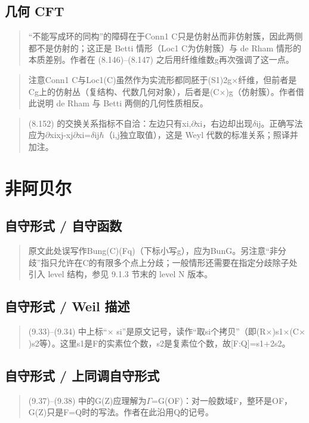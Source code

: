 \subsection*{几何 CFT}
\begin{quote}\small
“不能写成环的同构”的障碍在于Conn1 C只是仿射丛而非仿射簇，因此两侧都不是仿射的；这正是 Betti 情形（Loc1 C为仿射簇）与 de Rham 情形的本质差别。作者在 (8.146)–(8.147) 之后用纤维维数g再次强调了这一点。
\end{quote}

\begin{quote}\small
注意Conn1 C与Loc1(C)虽然作为实流形都同胚于(S1)2g$\times$纤维，但前者是Cg上的仿射丛（复结构、代数几何对象），后者是(C$\times$)g（仿射簇）。作者借此说明 de Rham 与 Betti 两侧的几何性质相反。
\end{quote}

\begin{quote}\small
(8.152) 的交换关系指标不自洽：左边只有xi,$\partial$xi，右边却出现$\delta$ij。正确写法应为$\partial$xixj-xj$\partial$xi=$\delta$ij$\hbar$（i,j独立取值），这是 Weyl 代数的标准关系；照译并加注。
\end{quote}

\section{非阿贝尔}
\subsection*{自守形式 / 自守函数}
\begin{quote}\small
原文此处误写作Bung(C)(Fq)（下标小写g），应为BunG。另注意“非分歧”指只允许在C的有限多个点上分歧；一般情形还需要在指定分歧除子处引入 level 结构，参见 9.1.3 节末的 level N 版本。
\end{quote}

\subsection*{自守形式 / Weil 描述}
\begin{quote}\small
(9.33)–(9.34) 中上标“$\times$ si”是原文记号，读作“取si个拷贝”（即(R$\times$)s1$\times$(C$\times$)s2等）。这里s1是F的实素位个数，s2是复素位个数，故[F:Q]=s1+2s2。
\end{quote}

\subsection*{自守形式 / 上同调自守形式}
\begin{quote}\small
(9.37)–(9.38) 中的G(Z)应理解为$\Gamma$=G(OF)：对一般数域F，整环是OF，G(Z)只是F=Q时的写法。作者在此沿用Q的记号。
\end{quote}

